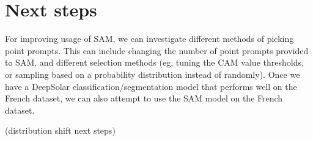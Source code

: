 \documentclass[10pt,twocolumn,letterpaper]{article}
\begin{document}
\section{Next steps}
For improving usage of SAM, we can investigate different methods of picking point prompts. This can include changing the number of point prompts provided to SAM, and different selection methods (eg, tuning the CAM value thresholds, or sampling based on a probability distribution instead of randomly). Once we have a DeepSolar classification/segmentation model that performs well on the French dataset, we can also attempt to use the SAM model on the French dataset. 

(distribution shift next steps)


{\small


}
\end{document}
